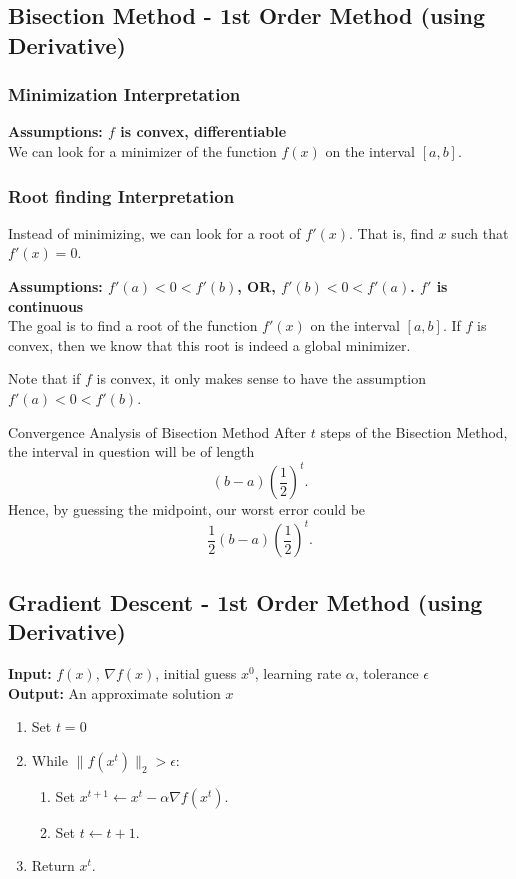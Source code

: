 \subsection{Bisection Method - 1st Order Method (using Derivative)}

\subsubsection{Minimization Interpretation}
\textbf{Assumptions: $f$ is convex, differentiable}\\

We can look for a minimizer of the function $f(x)$ on the interval $[a,b]$.


\subsubsection{Root finding Interpretation}
Instead of minimizing, we can look for a root of $f'(x)$.  That is, find $x$ such that $f'(x) = 0$.  

\textbf{Assumptions: $f'(a)<0 <  f'(b)$, OR, $f'(b) < 0 < f'(a)$.  $f'$ is continuous}\\
The goal is to find a root of the function $f'(x)$ on the interval $[a,b]$.  If $f$ is convex, then we know that this root is indeed a global minimizer.


Note that if $f$ is convex, it only makes sense to have the assumption $f'(a)<0 <  f'(b)$.






\begin{general}{Convergence Analysis of Bisection Method}{}
After $t$ steps of the Bisection Method, the interval in question will be of length
$$
(b-a)\left(\frac{1}{2}\right)^t.
$$
Hence, by guessing the midpoint, our worst error could be
$$
\frac{1}{2}(b-a)\left(\frac{1}{2}\right)^t.
$$
\end{general}

\subsection{Gradient Descent - 1st Order Method (using Derivative)}
\textbf{Input:} $f(x)$, $\nabla f(x)$, initial guess $x^0$, learning rate $\alpha$, tolerance $\epsilon$\\
\textbf{Output:} An approximate solution $x$

\begin{enumerate}
\item Set $t= 0$
\item While $\| f(x^t)\|_2 > \epsilon$:
\begin{enumerate}
\item Set $x^{t+1} \leftarrow x^t- \alpha \nabla f(x^t)$.
\item Set $t \leftarrow t+1$.
\end{enumerate}
\item Return $x^{t}$.
\end{enumerate}


